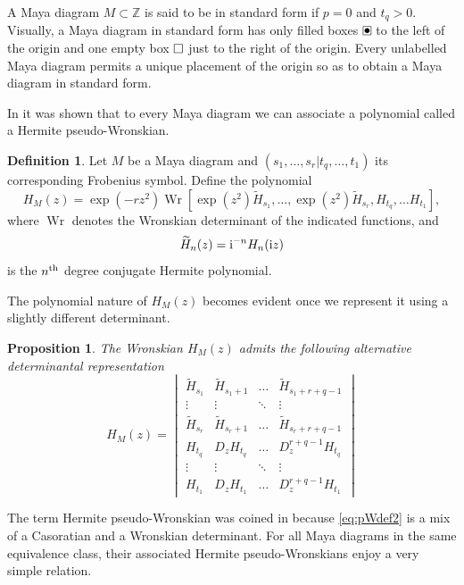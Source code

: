 \documentclass[10pt]{amsart}
\newtheorem{prop}[thm]{Proposition}
\theoremstyle{definition}
\newtheorem{definition}[thm]{Definition}
\numberwithin{equation}{section}
\numberwithin{figure}{section}
\newcommand{\Wr}{\operatorname{Wr}}
\newcommand{\Z}{\mathbb{Z}}
\newcommand{\supth}{{}^{\rm{th}}}
\renewcommand{\H}{H}%
\renewcommand{\th}{\widetilde{H}}
\newcommand{\h}{H}
\renewcommand{\boxdot}{{\ \clap{\raise0.25ex\hbox{$\bullet$}}\clap{$\square$}\ }}
\newcommand{\emptybox}{\hbox{$\square$}}
\newcommand{\ex}[1]{\exp(#1)}
\begin{document}
A Maya diagram $M\subset \Z$ is said to be in standard form if $p=0$
and $t_q>0$.  Visually, a Maya diagram in standard form has only
filled boxes $\boxdot$ to the left of the origin and one empty box
$\emptybox$ just to the right of the origin. Every unlabelled Maya
diagram permits a unique placement of the origin so as to obtain a
Maya diagram in standard form.

In \cite{gomez2016durfee} it was shown that to every Maya diagram we
can associate a polynomial called a Hermite pseudo-Wronskian.
\begin{definition}
  Let $M$ be a Maya diagram and $(s_1,\dots,s_r|t_q,\dots,t_1)$ its
  corresponding Frobenius symbol. Define the polynomial
  \begin{equation}\label{eq:pWdef1} \H_M(z) = \ex{-rz^2}\Wr[ \ex{z^2}
    \th_{s_1},\ldots, \ex{z^2} \th_{s_r}, \h_{t_q},\ldots \h_{t_1} ],
  \end{equation} where $\Wr$ denotes the Wronskian determinant of the
  indicated functions, and
  \begin{equation}
    \label{eq:thndef}
    \th_n(z)={\rm i}^{-n} \h_{n}({\rm i}z)
  \end{equation}
  is the $n\supth$ degree conjugate Hermite polynomial.
\end{definition}

The polynomial nature of $\H_M(z)$ becomes evident once we
represent it using a slightly different determinant.

\begin{prop} The Wronskian $\H_M(z)$ admits the following alternative
  determinantal representation
  \begin{equation}\label{eq:pWdef2} \H_M(z) =
    \begin{vmatrix} \th_{s_1} & \th_{s_1+1} & \ldots &
\th_{s_1+r+q-1}\\ \vdots & \vdots & \ddots & \vdots\\ \th_{s_r} &
\th_{s_r+1} & \ldots & \th_{s_r+r+q-1}\\ \h_{t_q} & D_{z} \h_{t_q} &
\ldots & D_{z}^{r+q-1}\h_{t_q}\\ \vdots & \vdots & \ddots & \vdots\\
\h_{t_1} & D_{z} \h_{t_1} & \ldots & D_{z}^{r+q-1}\h_{t_1}
    \end{vmatrix}
  \end{equation}

\end{prop} 
\noindent
The term Hermite
pseudo-Wronskian was coined in \cite{gomez2016durfee} because  \eqref{eq:pWdef2} is a mix of a Casoratian and a Wronskian
determinant.  For all Maya diagrams in the same equivalence class, their associated Hermite pseudo-Wronskians enjoy a very simple relation.
\end{document}
